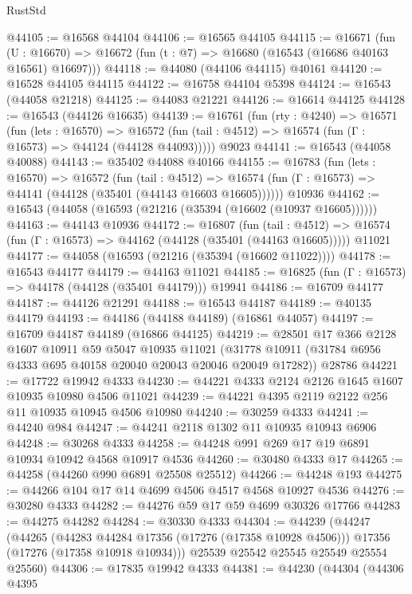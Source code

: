 \begin{lexlean}{RustStd}
\begin{coremodule}
@44105 := @16568 @44104
@44106 := @16565 @44105
@44115 := @16671
    (fun (U : @16670) => @16672 (fun (t : @7) => @16680 (@16543 (@16686 @40163 @16561) @16697)))
@44118 := @44080 (@44106 @44115) @40161
@44120 := @16528 @44105 @44115
@44122 := @16758 @44104 @5398
@44124 := @16543 (@44058 @21218)
@44125 := @44083 @21221
@44126 := @16614 @44125
@44128 := @16543 (@44126 @16635)
@44139 := @16761
    (fun (rty : @4240) =>
    @16571
      (fun (lets : @16570) =>
      @16572 (fun (tail : @4512) => @16574 (fun (Γ : @16573) => @44124 (@44128 @44093)))))
    @9023
@44141 := @16543 (@44058 @40088)
@44143 := @35402 @44088 @40166
@44155 := @16783
    (fun (lets : @16570) =>
    @16572
      (fun (tail : @4512) =>
      @16574 (fun (Γ : @16573) => @44141 (@44128 (@35401 (@44143 @16603 @16605))))))
    @10936
@44162 := @16543 (@44058 (@16593 (@21216 (@35394 (@16602 (@10937 @16605))))))
@44163 := @44143 @10936
@44172 := @16807
    (fun (tail : @4512) => @16574 (fun (Γ : @16573) => @44162 (@44128 (@35401 (@44163 @16605)))))
    @11021
@44177 := @44058 (@16593 (@21216 (@35394 (@16602 @11022))))
@44178 := @16543 @44177
@44179 := @44163 @11021
@44185 := @16825 (fun (Γ : @16573) => @44178 (@44128 (@35401 @44179))) @19941
@44186 := @16709 @44177
@44187 := @44126 @21291
@44188 := @16543 @44187
@44189 := @40135 @44179
@44193 := @44186 (@44188 @44189) (@16861 @44057)
@44197 := @16709 @44187 @44189 (@16866 @44125)
@44219 := @28501
    @17
    @366
    @2128
    @1607
    @10911
    @59
    @5047
    @10935
    @11021
    (@31778 @10911 (@31784 @6956 @4333 @695 @40158 @20040 @20043 @20046 @20049 @17282))
    @28786
@44221 := @17722 @19942 @4333
@44230 := @44221 @4333 @2124 @2126 @1645 @1607 @10935 @10980 @4506 @11021
@44239 := @44221 @4395 @2119 @2122 @256 @11 @10935 @10945 @4506 @10980
@44240 := @30259 @4333
@44241 := @44240 @984
@44247 := @44241 @2118 @1302 @11 @10935 @10943 @6906
@44248 := @30268 @4333
@44258 := @44248 @991 @269 @17 @19 @6891 @10934 @10942 @4568 @10917 @4536
@44260 := @30480 @4333 @17
@44265 := @44258 (@44260 @990 @6891 @25508 @25512)
@44266 := @44248 @193
@44275 := @44266 @104 @17 @14 @4699 @4506 @4517 @4568 @10927 @4536
@44276 := @30280 @4333
@44282 := @44276 @59 @17 @59 @4699 @30326 @17766
@44283 := @44275 @44282
@44284 := @30330 @4333
@44304 := @44239
    (@44247
      (@44265
        (@44283 @44284 @17356 (@17276 (@17358 @10928 @4506)))
        @17356
        (@17276 (@17358 @10918 @10934)))
      @25539
      @25542
      @25545
      @25549
      @25554
      @25560)
@44306 := @17835 @19942 @4333
@44381 := @44230
    (@44304
      (@44306
        @4395

\end{coremodule}
\end{lexlean}
